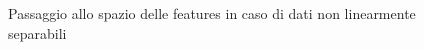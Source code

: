 \documentclass[oneside, openany]{book}
\begin{document}
		\begin{figure}[h]
		\centering
		 \quad
		 \quad
		 \quad
		 \quad
		\caption{Passaggio allo spazio delle features in caso di dati non linearmente separabili}
		\label{fig:hyp}
	\end{figure}	
\end{document}
